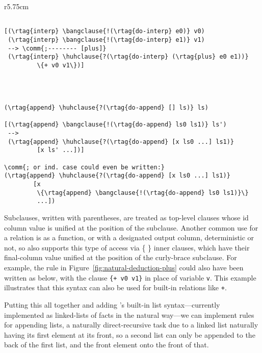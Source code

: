 \begin{wrapfigure}{r}{5.75cm}
\vspace{-0.3cm}
\begin{Verbatim}[baselinestretch=0.75,commandchars=\\\{\}]

[(\rtag{interp} \bangclause{!(\rtag{do-interp} e0)} v0)
 (\rtag{interp} \bangclause{!(\rtag{do-interp} e1)} v1) 
 --> \comm{;-------- [plus]}
 (\rtag{interp} \huhclause{?(\rtag{do-interp} (\rtag{plus} e0 e1))}
         \{+ v0 v1\})]




(\rtag{append} \huhclause{?(\rtag{do-append} [] ls)} ls)

[(\rtag{append} \bangclause{!(\rtag{do-append} ls0 ls1)} ls')
 -->
 (\rtag{append} \huhclause{?(\rtag{do-append} [x ls0 ...] ls1)}
         [x ls' ...])]

\comm{; or ind. case could even be written:}
(\rtag{append} \huhclause{?(\rtag{do-append} [x ls0 ...] ls1)}
        [x
         \{\rtag{append} \bangclause{!(\rtag{do-append} ls0 ls1)}\}
         ...])
\end{Verbatim}
\end{wrapfigure}
%
Subclauses, written with parentheses, are treated as top-level clauses whose id column value is unified at the position of the subclause. Another common use for a relation is as a function, or with a designated output column, deterministic or not, so \slog{} also supports this type of access via \{ \!\} inner clauses, which have their final-column value unified at the position of the curly-brace subclause. For example, the rule in Figure~\ref{fig:natural-deduction-plus} could also have been written as below, with the clause \texttt{\{+ v0 v1\}} in place of variable \texttt{v}.
This example illustrates that this syntax can also be used for built-in relations like \texttt{+}.

Putting this all together and adding \slog{}'s built-in list syntax---currently implemented as linked-lists of \slog{} facts in the natural way---we can implement rules for appending lists, a naturally direct-recursive task due to a linked list naturally having its first element at its front, so a second list can only be appended to the back of the first list, and the front element onto the front of that.
%



